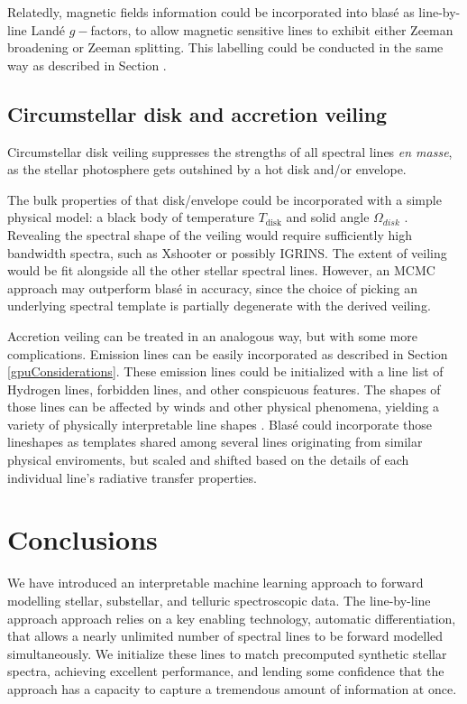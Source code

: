 \documentclass[twocolumn]{aastex631}
\begin{document}
Relatedly, magnetic fields information could be incorporated into blas\'e as line-by-line Land\'e $g-$factors, to allow magnetic sensitive lines to exhibit either Zeeman broadening or Zeeman splitting.  This labelling could be conducted in the same way as described in Section \citep{secMissingLines}.

\subsection{Circumstellar disk and accretion veiling}
Circumstellar disk veiling suppresses the strengths of all spectral lines \emph{en masse}, as the stellar photosphere gets outshined by a hot disk and/or envelope.

The bulk properties of that disk/envelope could be incorporated with a simple physical model: a black body of temperature $T_\mathrm{disk}$ and solid angle $\Omega_{disk}$ \citep{2018ApJ...862...85G}.  Revealing the spectral shape of the veiling would require sufficiently high bandwidth spectra, such as Xshooter \citep{2011A&A...536A.105V} or possibly IGRINS.  The extent of veiling would be fit alongside all the other stellar spectral lines.  However, an MCMC approach may outperform blas\'e in accuracy, since the choice of picking an underlying spectral template is partially degenerate with the derived veiling.

Accretion veiling can be treated in an analogous way, but with some more complications.  Emission lines can be easily incorporated as described in Section \ref{gpuConsiderations}.
These emission lines could be initialized with a line list of Hydrogen lines, forbidden lines, and other conspicuous features.  The shapes of those lines can be affected by winds and other physical phenomena, yielding a variety of physically interpretable line shapes \citep{2022arXiv220802940E}.  Blas\'e could incorporate those lineshapes as templates shared among several lines originating from similar physical enviroments, but scaled and shifted based on the details of each individual line's radiative transfer properties.



\section{Conclusions}
We have introduced an interpretable machine learning approach to forward modelling stellar, substellar, and telluric spectroscopic data.  The line-by-line approach approach relies on a key enabling technology, automatic differentiation, that allows a nearly unlimited number of spectral lines to be forward modelled simultaneously.  We initialize these lines to match precomputed synthetic stellar spectra, achieving excellent performance, and lending some confidence that the approach has a capacity to capture a tremendous amount of information at once.
\end{document}
